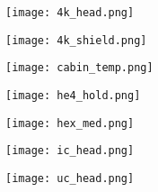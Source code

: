 \documentclass{article}
\begin{document}
\begin{figure}
    \centering
    \texttt{[image: 4k\_head.png]}
\end{figure}
\begin{figure}
    \centering
    \texttt{[image: 4k\_shield.png]}
\end{figure}
\clearpage
\begin{figure}
    \centering
    \texttt{[image: cabin\_temp.png]}
\end{figure}
\begin{figure}
    \centering
    \texttt{[image: he4\_hold.png]}
\end{figure}
\clearpage
\begin{figure}
    \centering
    \texttt{[image: hex\_med.png]}
\end{figure}
\begin{figure}
    \centering
    \texttt{[image: ic\_head.png]}
\end{figure}
\clearpage
\begin{figure}
    \centering
    \texttt{[image: uc\_head.png]}
\end{figure}
\end{document}
